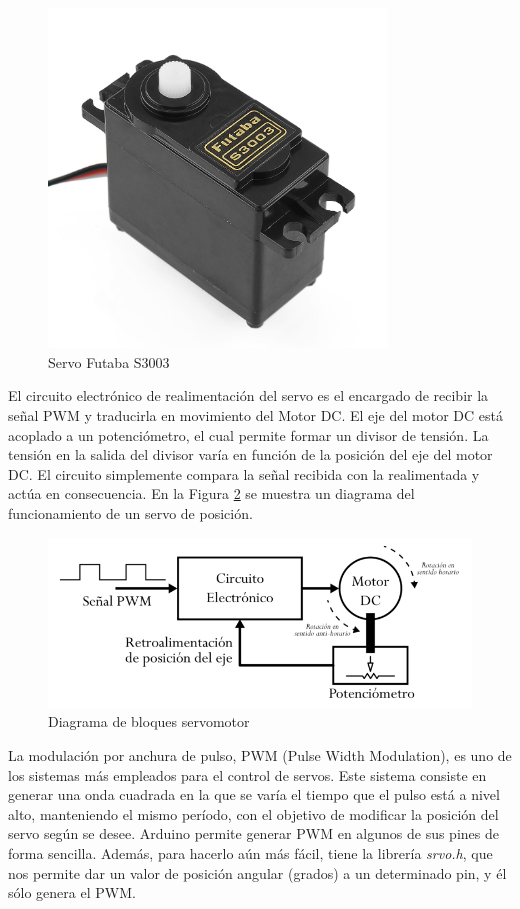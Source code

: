 \begin{figure}[h]
\centering
\includegraphics[width=90mm]{Figures/futaba.png}
\caption[Servo Futaba S3003]{Servo Futaba S3003}
\label{fig:futaba}
\end{figure}

El circuito electrónico de realimentación del servo es el encargado de recibir la señal PWM y traducirla en movimiento del Motor DC. El eje del motor DC está acoplado a un potenciómetro, el cual permite formar un divisor de tensión. La tensión en la salida del divisor varía en función de la posición del eje del motor DC. El circuito simplemente compara la señal recibida con la realimentada y actúa en consecuencia. En la Figura \ref{fig:ServoDiag} se muestra un diagrama del funcionamiento de un servo de posición.

\begin{figure}[h]
\centering
\includegraphics[width=140mm]{Figures/servo-diag.png}
\caption[Diagrama de bloques servomotor]{Diagrama de bloques servomotor}
\label{fig:ServoDiag}
\end{figure}


La modulación por anchura de pulso, PWM (Pulse Width Modulation), es uno de los sistemas más empleados para el control de servos. Este sistema consiste en generar una onda cuadrada en la que se varía el tiempo que el pulso está a nivel alto, manteniendo el mismo período, con el objetivo de modificar la posición del servo según se desee. Arduino permite generar PWM en algunos de sus pines de forma sencilla. Además, para hacerlo aún más fácil, tiene la librería \textit{srvo.h}, que nos permite dar un valor de posición angular (grados) a un determinado pin, y él sólo genera el PWM.

